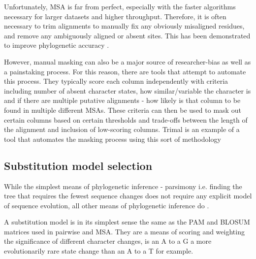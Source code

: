 Unfortunately, MSA is far from perfect, especially with the faster algorithms 
necessary for larger datasets and higher throughput.  Therefore,
it is often necessary to trim alignments to manually fix any obviously 
misaligned residues, and remove any ambiguously aligned or absent sites.
This has been demonstrated to improve phylogenetic accuracy \citep{Talavera2007}.


However, manual masking can also be a major source of researcher-bias as well
as a painstaking process.  For this reason, there are tools that attempt to 
automate this process.   They typically score each column independently with
criteria including number of absent character states, how similar/variable the
character is and if there are multiple putative alignments - how likely is
that column to be found in multiple different MSAs.
These criteria can then be used to mask out certain columns based on certain
thresholds and trade-offs between the length of the alignment and inclusion
of low-scoring columns.  
Trimal is an example of a tool that automates the masking process
using this sort of methodology \citep{Capella-Gutierrez2009}


\subsection{Substitution model selection}

While the simplest means of phylogenetic inference - parsimony i.e. finding
the tree that requires the fewest sequence changes does not require any explicit
model of sequence evolution, all other means of phylogenetic inference do \citep{Le2008}.


A substitution model is in its simplest sense the same as the PAM and BLOSUM
matrices used in pairwise and MSA.  They are a means of scoring and weighting
the significance of different character changes, is an A to a G a more evolutionarily
rare state change than an A to a T for example.

